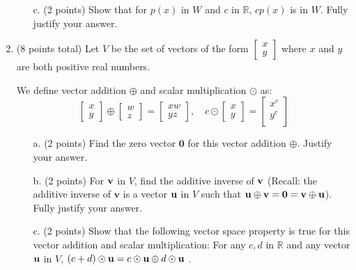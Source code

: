 \documentclass[12pt]{extarticle}
\begin{document}
\begin{enumerate}
\begin{itemize}
 \item[c.] (2 points)  Show that for $p(x)$ in $W$ and $c$ in $\mathbb{R}$, $cp(x)$ is in $W$. Fully justify your answer.

\vfill    


\end{itemize}

 
    \newpage





\item (8 points total) Let $V$ be the set of vectors of the form $\begin{bmatrix} x\\y\end{bmatrix}$ where $x$ and $y$ are both positive real numbers. 

We define vector addition  $\oplus$ and scalar multiplication $\odot$ as:
    $$\begin{bmatrix} x \\ y \end{bmatrix}\oplus \begin{bmatrix} w \\ z \end{bmatrix}=\begin{bmatrix} xw\\ yz \end{bmatrix}, \quad c\odot\begin{bmatrix} x \\ y \end{bmatrix}=\begin{bmatrix} x^c \\ y^c\\\end{bmatrix}$$



\begin{itemize}
\item[a.] (2 points) Find the zero vector $\mathbf{0}$ for this vector addition $\oplus$. Justify your answer.


\vfill


\item[b.]  (2 points) For ${\mathbf{v}}$ in $V$, find the additive inverse of ${\mathbf{v}}$ (Recall: the additive inverse of $\mathbf{v}$ is a vector ${\mathbf{u}}$ in $V$ such that ${\mathbf{u}}\oplus{\mathbf{v}}=\mathbf{0}={\mathbf{v}}\oplus {\mathbf{u}}$). Fully justify your answer.

\vfill

\item[c.] (2 points) Show that the following vector space property is true for this vector addition and scalar multiplication: For any $c,d$ in $\mathbb{R}$ and any vector ${\mathbf{u}}$ in $V$, $(c + d) \odot {\mathbf{u}}=c\odot {\mathbf{u}}\oplus d\odot {\mathbf{u}}$ .


\end{itemize}
\end{enumerate}
\end{document}
